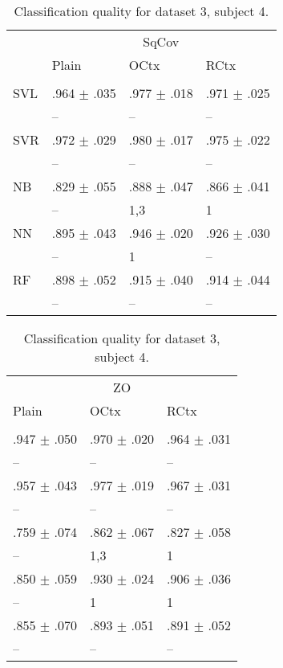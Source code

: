 \begin{table}[htb]
\renewcommand{\arraystretch}{0.6}
\centering
\footnotesize
\caption{Classification quality for dataset 3, subject 4.\label{table:Set3_patient4_res}}
\begin{tabular}{llll}
 & \multicolumn{3}{c}{SqCov} \\
 & Plain & OCtx & RCtx \\
 \cmidrule(lr){2-4}\\
SVL & .964 $\pm$ .035 & .977 $\pm$ .018 & .971 $\pm$ .025 \\
 & -- & -- & -- \\
SVR & .972 $\pm$ .029 & .980 $\pm$ .017 & .975 $\pm$ .022 \\
 & -- & -- & -- \\
NB & .829 $\pm$ .055 & .888 $\pm$ .047 & .866 $\pm$ .041 \\
 & -- & {\scriptsize 1,3} & {\scriptsize 1} \\
NN & .895 $\pm$ .043 & .946 $\pm$ .020 & .926 $\pm$ .030 \\
 & -- & {\scriptsize 1} & -- \\
RF & .898 $\pm$ .052 & .915 $\pm$ .040 & .914 $\pm$ .044 \\
 & -- & -- & -- \\
\end{tabular}%
\begin{tabular}{lll}
  \multicolumn{3}{c}{ZO} \\
  Plain & OCtx & RCtx \\
  \cmidrule(lr){1-3}\\
 .947 $\pm$ .050 & .970 $\pm$ .020 & .964 $\pm$ .031 \\
  -- & -- & -- \\
 .957 $\pm$ .043 & .977 $\pm$ .019 & .967 $\pm$ .031 \\
  -- & -- & -- \\
 .759 $\pm$ .074 & .862 $\pm$ .067 & .827 $\pm$ .058 \\
  -- & {\scriptsize 1,3} & {\scriptsize 1} \\
 .850 $\pm$ .059 & .930 $\pm$ .024 & .906 $\pm$ .036 \\
  -- & {\scriptsize 1} & {\scriptsize 1} \\
 .855 $\pm$ .070 & .893 $\pm$ .051 & .891 $\pm$ .052 \\
  -- & -- & -- \\
\end{tabular}
\end{table}

